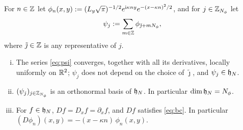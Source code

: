 \begin{lemma}\label{lem:orbitals}
For $n\in\mathbb{Z}$ let $\phi_n(x,y):=(L_y\sqrt\pi)^{-1/2}e^{\mathrm{i}\kappa ny}e^{-(x-\kappa n)^2/2}$, and for
$j\in\mathbb{Z}_{N_{\phi}}$ let
\begin{equation}\label{eq:psi}
\psi_j:=\sum_{m\in\mathbb{Z}}\phi_{\tilde\jmath+mN_{\phi}},
\end{equation}
where $\tilde\jmath\in\mathbb{Z}$ is any representative of $j$.
\begin{enumerate}[(i)]
\item The series \eqref{eq:psi} converges, together with all its derivatives, locally uniformly on $\mathbb{R}^2$;
$\psi_j$ does not depend on the choice of $\tilde\jmath$, and $\psi_j\in\mathfrak{h}_N$.
\item $(\psi_j)_{j\in\mathbb{Z}_{N_{\phi}}}$ is an orthonormal basis of $\mathfrak{h}_N$. In particular $\dim\mathfrak{h}_N=N_{\phi}$.
\item For $f\in\mathfrak{h}_N$, $Df=D_xf=\partial_xf$, and $Df$ satisfies \eqref{eq:bc}. In particular
$(D\phi_n)(x,y)=-(x-\kappa n)\,\phi_n(x,y)$.
\end{enumerate}
\end{lemma}

